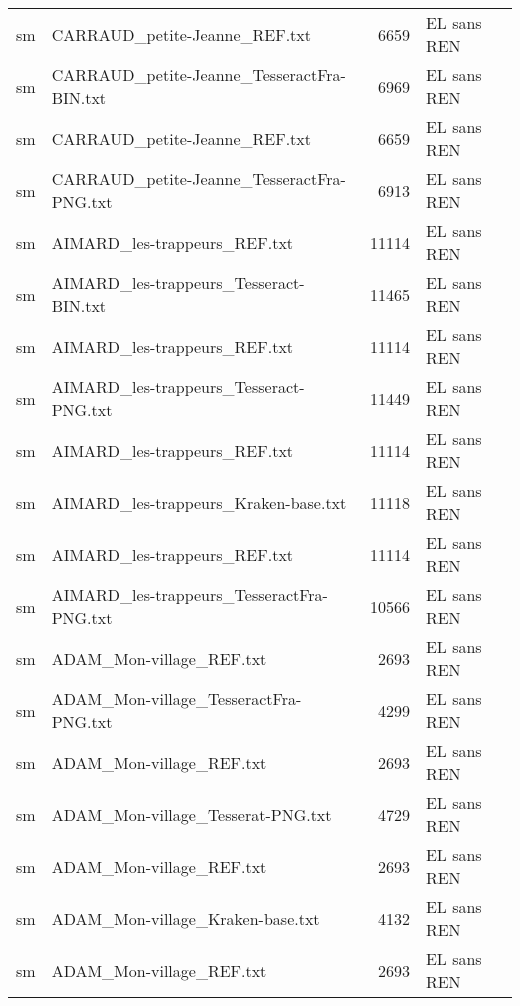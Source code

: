 \begin{tabular}{llrl}
    sm &                      CARRAUD\_petite-Jeanne\_REF.txt &                  6659 & EL sans REN \\
    sm &         CARRAUD\_petite-Jeanne\_TesseractFra-BIN.txt &                  6969 & EL sans REN \\
    sm &                      CARRAUD\_petite-Jeanne\_REF.txt &                  6659 & EL sans REN \\
    sm &         CARRAUD\_petite-Jeanne\_TesseractFra-PNG.txt &                  6913 & EL sans REN \\
    sm &                       AIMARD\_les-trappeurs\_REF.txt &                 11114 & EL sans REN \\
    sm &             AIMARD\_les-trappeurs\_Tesseract-BIN.txt &                 11465 & EL sans REN \\
    sm &                       AIMARD\_les-trappeurs\_REF.txt &                 11114 & EL sans REN \\
    sm &             AIMARD\_les-trappeurs\_Tesseract-PNG.txt &                 11449 & EL sans REN \\
    sm &                       AIMARD\_les-trappeurs\_REF.txt &                 11114 & EL sans REN \\
    sm &               AIMARD\_les-trappeurs\_Kraken-base.txt &                 11118 & EL sans REN \\
    sm &                       AIMARD\_les-trappeurs\_REF.txt &                 11114 & EL sans REN \\
    sm &          AIMARD\_les-trappeurs\_TesseractFra-PNG.txt &                 10566 & EL sans REN \\
    sm &                           ADAM\_Mon-village\_REF.txt &                  2693 & EL sans REN \\
    sm &              ADAM\_Mon-village\_TesseractFra-PNG.txt &                  4299 & EL sans REN \\
    sm &                           ADAM\_Mon-village\_REF.txt &                  2693 & EL sans REN \\
    sm &                  ADAM\_Mon-village\_Tesserat-PNG.txt &                  4729 & EL sans REN \\
    sm &                           ADAM\_Mon-village\_REF.txt &                  2693 & EL sans REN \\
    sm &                   ADAM\_Mon-village\_Kraken-base.txt &                  4132 & EL sans REN \\
    sm &                           ADAM\_Mon-village\_REF.txt &                  2693 & EL sans REN \\

\end{tabular}
